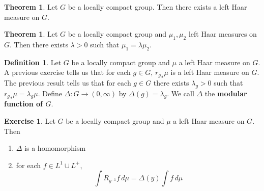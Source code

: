 \documentclass{book}
\theoremstyle{definition}
\newtheorem{defn}[definition]{Definition}
\newtheorem{thm}[definition]{Theorem}
\newtheorem{ex}[definition]{Exercise}
\newcommand{\lam}{\lambda}
\newcommand{\Del}{\Delta}
\newcommand{\lex}[1]{\label{ex:#1}}
\newcommand{\ld}[1]{\label{defn:#1}}
\DeclareMathOperator*{\0}{\mbf{0}}
\DeclareMathOperator*{\1}{\mbf{1}}
\newcommand{\dmu}{\, d \mu}
\begin{document}
	\begin{thm}
		Let $G$ be a locally compact group. Then there exists a left Haar measure on $G$. 
	\end{thm}
	
	\begin{thm}
		Let $G$ be a locally compact group and $\mu_1, \mu_2$ left Haar measures on $G$. Then there exists $\lam > 0$ such that $\mu_1 = \lam \mu_2 $.
	\end{thm}
	
	\begin{defn} \ld{00000} 
		Let $G$ be a locally compact group and $\mu$ a left Haar measure on $G$. A previous exercise tells us that for each $g \in G$, ${r_g}_*\mu$ is a left Haar measure on $G$. The previous result tells us that for each $g \in G$ there exists $\lam_g >0$ such that ${r_g}_*\mu = \lam_g \mu$. Define $\Del: G \rightarrow (0, \infty)$ by $\Del(g) = \lam_g$. We call $\Del$ the \textbf{modular function of $G$}. 
	\end{defn}

	\begin{ex} \lex{00000} 
		Let $G$ be a locally compact group and $\mu$ a left Haar measure on $G$. Then 
		\begin{enumerate}
			\item $\Del $ is a homomorphism 
			\item for each $f \in L^1 \cup L^+$, $$\int R_{y^{-1}} f \dmu = \Del(y) \int f \dmu$$
		\end{enumerate}
	\end{ex}
\end{document}
